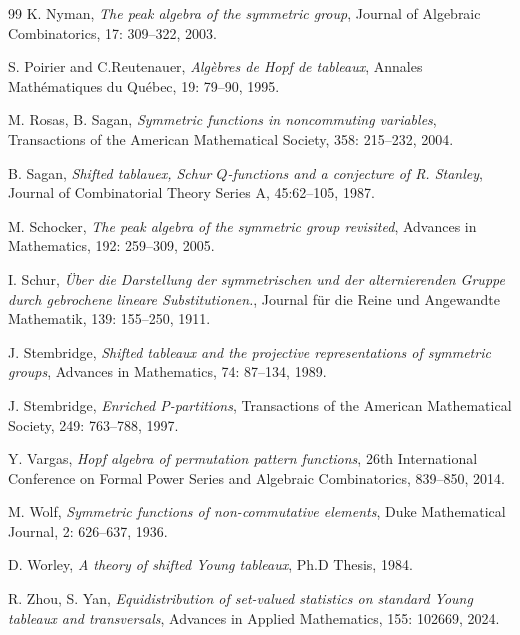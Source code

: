 \documentclass[12pt]{amsart}
\numberwithin{equation}{section}
\begin{document}
\begin{thebibliography}{99}
	 K. Nyman,
	\newblock \textit{The peak algebra of the symmetric group},
	\newblock Journal of Algebraic Combinatorics, 17: 309--322, 2003.
	
	 S. Poirier and C.Reutenauer,
	\newblock \textit{Alg\`{e}bres de Hopf de tableaux},
	\newblock Annales Math\'{e}matiques du Qu\'{e}bec, 19: 79--90, 1995.	

	 M. Rosas, B. Sagan, 
	\newblock \textit{Symmetric functions in noncommuting variables},
	\newblock Transactions of the American Mathematical Society, 358: 215--232, 2004.
	
	 B. Sagan, 
	\newblock \textit{Shifted tablauex, Schur $Q$-functions and a conjecture of R. Stanley},
	\newblock Journal of Combinatorial Theory Series A, 45:62--105, 1987.
	
	 M. Schocker,
	\newblock \textit{The peak algebra of the symmetric group revisited},
	\newblock Advances in Mathematics, 192: 259--309, 2005.
	
	 I. Schur,
	\newblock \textit{\"Uber die Darstellung der symmetrischen und der alternierenden Gruppe durch gebrochene lineare Substitutionen.},
	\newblock  Journal f\"ur die Reine und Angewandte Mathematik, 139: 155--250, 1911.
	
	 J. Stembridge,
	\newblock \textit{Shifted tableaux and the projective representations of symmetric groups},
	\newblock Advances in Mathematics, 74: 87--134, 1989.
	
	 J. Stembridge,
	\newblock \textit{Enriched P-partitions},
	\newblock Transactions of the American Mathematical Society, 249: 763--788, 1997.

	 Y. Vargas,
	\newblock \textit{Hopf algebra of permutation pattern functions},
	\newblock 26th International Conference on Formal Power Series and Algebraic Combinatorics, 839--850, 2014.
	
	 M. Wolf,
	\newblock \textit{Symmetric functions of non-commutative elements},
	\newblock Duke Mathematical Journal, 2: 626--637, 1936.
	
	 D. Worley,
	\newblock \textit{A theory of shifted Young tableaux},
	\newblock Ph.D Thesis, 1984.
	
	 R. Zhou, S. Yan, 
\newblock \textit{Equidistribution of set-valued statistics on standard Young tableaux and transversals},
\newblock Advances in Applied Mathematics, 155: 102669, 2024.
\end{thebibliography}  
\end{document}
